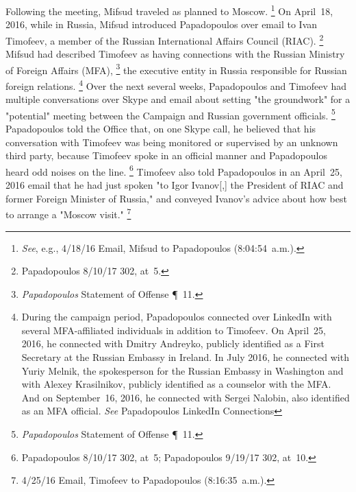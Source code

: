 Following the meeting, Mifsud traveled as planned to Moscow.%
\footnote{\textit{See}, e.g., 4/18/16 Email, Mifsud to Papadopoulos (8:04:54~a.m.).}
On April~18, 2016, while in Russia, Mifsud introduced Papadopoulos over email to Ivan Timofeev, a member of the Russian International Affairs Council (RIAC).%
\footnote{Papadopoulos 8/10/17 302, at~5.}
Mifsud had described Timofeev as having connections with the Russian Ministry of Foreign Affairs (MFA),%
\footnote{\textit{Papadopoulos} Statement of Offense \P~11.}
the executive entity in Russia responsible for Russian foreign relations.%
\footnote{During the campaign period, Papadopoulos connected over LinkedIn with several MFA-affiliated individuals in addition to Timofeev.
On April~25, 2016, he connected with Dmitry Andreyko, publicly identified as a First Secretary at the Russian Embassy in Ireland.
In July 2016, he connected with Yuriy Melnik, the spokesperson for the Russian Embassy in Washington and with Alexey Krasilnikov, publicly identified as a counselor with the MFA\null.
And on September~16, 2016, he connected with Sergei Nalobin, also identified as an MFA official.
\textit{See} Papadopoulos LinkedIn Connections }
Over the next several weeks, Papadopoulos and Timofeev had multiple conversations over Skype and email about setting "the groundwork" for a "potential" meeting between the Campaign and Russian government officials.%
\footnote{\textit{Papadopoulos} Statement of Offense \P~11.}
Papadopoulos told the Office that, on one Skype call, he believed that his conversation with Timofeev was being monitored or supervised by an unknown third party, because Timofeev spoke in an official manner and Papadopoulos heard odd noises on the line.%
\footnote{Papadopoulos 8/10/17 302, at~5; Papadopoulos 9/19/17 302, at~10.}
Timofeev also told Papadopoulos in an April~25, 2016 email that he had just spoken "to Igor Ivanov[,] the President of RIAC and former Foreign Minister of Russia," and conveyed Ivanov's advice about how best to arrange a "Moscow visit."%
\footnote{4/25/16 Email, Timofeev to Papadopoulos (8:16:35~a.m.).}


